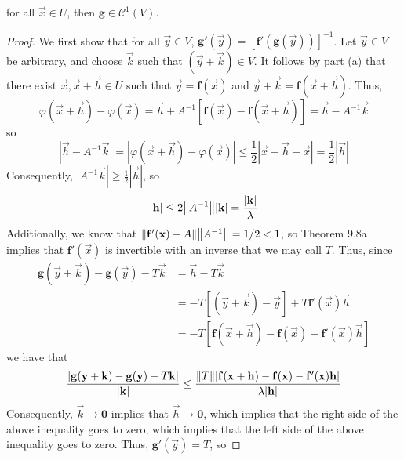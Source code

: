 \documentclass[../notes.tex]{subfiles}
\begin{document}
\begin{itemize}
\begin{enumerate}[label={(\alph*)}]
\begin{equation*}
        \end{equation*}
        for all $\vec{x}\in U$, then $\mathbf{g}\in\mathscr{C}^1(V)$.
        \begin{proof}
            We first show that for all $\vec{y}\in V$, $\mathbf{g}'(\vec{y})=[\mathbf{f}'(\mathbf{g}(\vec{y}))]^{-1}$. Let $\vec{y}\in V$ be arbitrary, and choose $\vec{k}$ such that $(\vec{y}+\vec{k})\in V$. It follows by part (a) that there exist $\vec{x},\vec{x}+\vec{h}\in U$ such that $\vec{y}=\mathbf{f}(\vec{x})$ and $\vec{y}+\vec{k}=\mathbf{f}(\vec{x}+\vec{h})$. Thus,
            \begin{equation*}
                \varphi(\vec{x}+\vec{h})-\varphi(\vec{x}) = \vec{h}+A^{-1}[\mathbf{f}(\vec{x})-\mathbf{f}(\vec{x}+\vec{h})]
                = \vec{h}-A^{-1}\vec{k}
            \end{equation*}
            so
            \begin{equation*}
                |\vec{h}-A^{-1}\vec{k}| = |\varphi(\vec{x}+\vec{h})-\varphi(\vec{x})|
                \leq \frac{1}{2}|\vec{x}+\vec{h}-\vec{x}|
                = \frac{1}{2}|\vec{h}|
            \end{equation*}
            Consequently, $|A^{-1}\vec{k}|\geq\frac{1}{2}|\vec{h}|$, so
            \begin{equation*}
                |\mathbf{h}| \leq 2\norm{A^{-1}}|\mathbf{k}|
                = \frac{|\mathbf{k}|}{\lambda}
            \end{equation*}
            Additionally, we know that $\norm{\mathbf{f}'(\mathbf{x})-A}\norm{A^{-1}}=1/2<1$, so Theorem 9.8a implies that $\mathbf{f}'(\vec{x})$ is invertible with an inverse that we may call $T$. Thus, since
            \begin{align*}
                \mathbf{g}(\vec{y}+\vec{k})-\mathbf{g}(\vec{y})-T\vec{k} &= \vec{h}-T\vec{k}\\
                &= -T[(\vec{y}+\vec{k})-\vec{y}]+T\mathbf{f}'(\vec{x})\vec{h}\\
                &= -T[\mathbf{f}(\vec{x}+\vec{h})-\mathbf{f}(\vec{x})-\mathbf{f}'(\vec{x})\vec{h}]
            \end{align*}
            we have that
            \begin{equation*}
                \frac{|\mathbf{g}(\mathbf{y}+\mathbf{k})-\mathbf{g}(\mathbf{y})-T\mathbf{k}|}{|\mathbf{k}|} \leq \frac{\norm{T}|\mathbf{f}(\mathbf{x}+\mathbf{h})-\mathbf{f}(\mathbf{x})-\mathbf{f}'(\mathbf{x})\mathbf{h}|}{\lambda|\mathbf{h}|}
            \end{equation*}
            Consequently, $\vec{k}\to\bm{0}$ implies that $\vec{h}\to\bm{0}$, which implies that the right side of the above inequality goes to zero, which implies that the left side of the above inequality goes to zero. Thus, $\mathbf{g}'(\vec{y})=T$, so

\end{proof}
\end{enumerate}
\end{itemize}
\end{document}

